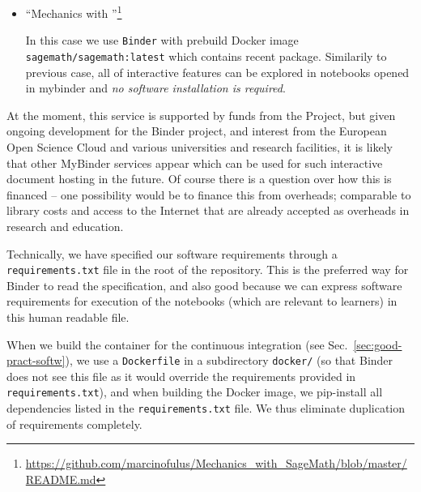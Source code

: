 \documentclass{deliverablereport}
\begin{document}
{{{\begin{itemize}
\item ``Mechanics with \SageMath''\footnote{\scriptsize\url{https://github.com/marcinofulus/Mechanics_with_SageMath/blob/master/README.md}}

In this case we use \texttt{Binder} with prebuild Docker image
\texttt{sagemath/sagemath:latest} which contains recent \SageMath
package. Similarily to previous case, all of interactive features can
be explored in notebooks opened in mybinder and \emph{no software
  installation is required}.


\end{itemize}



At the moment, this service is supported by funds from the \Jupyter
Project, but given ongoing development for the Binder project, and
interest from the European Open Science Cloud and various universities
and research facilities, it is likely that other MyBinder services
appear which can be used for such interactive document hosting in the
future. Of course there is a question over how this is financed -- one
possibility would be to finance this from overheads; comparable to
library costs and access to the Internet that are already accepted as
overheads in research and education.

Technically, we have specified our software requirements through a
\texttt{requirements.txt} file in the root of the repository. This is
the preferred way for Binder to read the specification, and also good
because we can express software requirements for execution of the
notebooks (which are relevant to learners) in this human readable
file.

When we build the container for the continuous integration (see
Sec.~\ref{sec:good-pract-softw}), we use a \texttt{Dockerfile} in a
subdirectory \texttt{docker/} (so that Binder does not see this file
as it would override the requirements provided in
\texttt{requirements.txt}), and when building the Docker image, we
pip-install all dependencies listed in the \texttt{requirements.txt}
file. We thus eliminate duplication of requirements completely.



\pagebreak
\appendix
}}}
\end{document}
